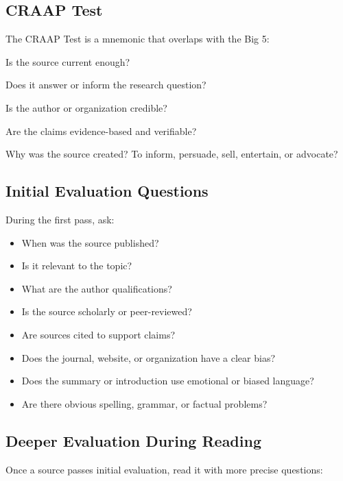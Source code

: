 \documentclass[11pt,letterpaper]{article}
\begin{document}
\subsection{CRAAP Test}

The CRAAP Test is a mnemonic that overlaps with the Big 5:

\begin{description}[leftmargin=1.15in,style=nextline]
  \item[Currency] Is the source current enough?
  \item[Relevance] Does it answer or inform the research question?
  \item[Authority] Is the author or organization credible?
  \item[Accuracy] Are the claims evidence-based and verifiable?
  \item[Purpose] Why was the source created? To inform, persuade, sell, entertain, or advocate?
\end{description}

\subsection{Initial Evaluation Questions}

During the first pass, ask:

\begin{itemize}
  \item When was the source published?
  \item Is it relevant to the topic?
  \item What are the author qualifications?
  \item Is the source scholarly or peer-reviewed?
  \item Are sources cited to support claims?
  \item Does the journal, website, or organization have a clear bias?
  \item Does the summary or introduction use emotional or biased language?
  \item Are there obvious spelling, grammar, or factual problems?
\end{itemize}

\subsection{Deeper Evaluation During Reading}

Once a source passes initial evaluation, read it with more precise questions:
\end{document}
